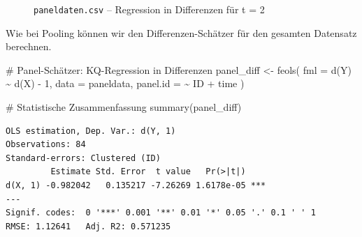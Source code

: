\documentclass[
  a4paper,
  DIV=11,
  oneside]{scrreprt}
\newenvironment{Shaded}{\begin{snugshade}}{\end{snugshade}}
\newcommand{\AttributeTok}[1]{\textcolor[rgb]{0.40,0.45,0.13}{#1}}
\newcommand{\CommentTok}[1]{\textcolor[rgb]{0.37,0.37,0.37}{#1}}
\newcommand{\DecValTok}[1]{\textcolor[rgb]{0.68,0.00,0.00}{#1}}
\newcommand{\FunctionTok}[1]{\textcolor[rgb]{0.28,0.35,0.67}{#1}}
\newcommand{\NormalTok}[1]{\textcolor[rgb]{0.00,0.23,0.31}{#1}}
\newcommand{\OtherTok}[1]{\textcolor[rgb]{0.00,0.23,0.31}{#1}}
\newcommand{\SpecialCharTok}[1]{\textcolor[rgb]{0.37,0.37,0.37}{#1}}
\begin{document}
\begin{figure}[t]


\caption{\label{fig-diffregression1}\texttt{paneldaten.csv} --
Regression in Differenzen für t = 2}

\end{figure}%

Wie bei Pooling können wir den Differenzen-Schätzer für den gesamten
Datensatz berechnen.

\begin{Shaded}
\begin{Highlighting}[]
\CommentTok{\# Panel{-}Schätzer: KQ{-}Regression in Differenzen}
\NormalTok{panel\_diff }\OtherTok{\textless{}{-}} \FunctionTok{feols}\NormalTok{(}
  \AttributeTok{fml =} \FunctionTok{d}\NormalTok{(Y) }\SpecialCharTok{\textasciitilde{}} \FunctionTok{d}\NormalTok{(X) }\SpecialCharTok{{-}} \DecValTok{1}\NormalTok{, }
  \AttributeTok{data =}\NormalTok{ paneldata,}
  \AttributeTok{panel.id =} \SpecialCharTok{\textasciitilde{}}\NormalTok{ ID }\SpecialCharTok{+}\NormalTok{ time}
\NormalTok{)}

\CommentTok{\# Statistische Zusammenfassung}
\FunctionTok{summary}\NormalTok{(panel\_diff)}
\end{Highlighting}
\end{Shaded}

\begin{verbatim}
OLS estimation, Dep. Var.: d(Y, 1)
Observations: 84
Standard-errors: Clustered (ID) 
         Estimate Std. Error  t value   Pr(>|t|)    
d(X, 1) -0.982042   0.135217 -7.26269 1.6178e-05 ***
---
Signif. codes:  0 '***' 0.001 '**' 0.01 '*' 0.05 '.' 0.1 ' ' 1
RMSE: 1.12641   Adj. R2: 0.571235
\end{verbatim}
\end{document}

